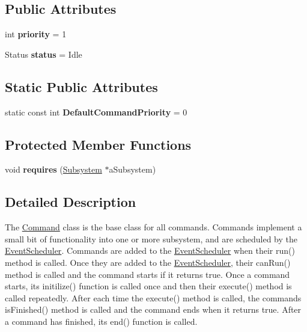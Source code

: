 \subsection*{Public Attributes}
\begin{DoxyCompactItemize}
\item 
\mbox{\label{classlib_iterative_robot_1_1_command_af2fd312376da33f5eba582db90389511}} 
int {\bfseries priority} = 1
\item 
\mbox{\label{classlib_iterative_robot_1_1_command_a54548a957a6b4097837c41fcc660467e}} 
Status {\bfseries status} = Idle
\end{DoxyCompactItemize}
\subsection*{Static Public Attributes}
\begin{DoxyCompactItemize}
\item 
\mbox{\label{classlib_iterative_robot_1_1_command_a37cc89119a9f76d0dda57ea21c877c7c}} 
static const int {\bfseries Default\+Command\+Priority} = 0
\end{DoxyCompactItemize}
\subsection*{Protected Member Functions}
\begin{DoxyCompactItemize}
\item 
\mbox{\label{classlib_iterative_robot_1_1_command_ad7b7f328974f5f17a2a4b1593b6c9eb5}} 
void {\bfseries requires} (\mbox{\hyperlink{classlib_iterative_robot_1_1_subsystem}{Subsystem}} $\ast$a\+Subsystem)
\end{DoxyCompactItemize}


\subsection{Detailed Description}
The \mbox{\hyperlink{classlib_iterative_robot_1_1_command}{Command}} class is the base class for all commands. Commands implement a small bit of functionality into one or more subsystem, and are scheduled by the \mbox{\hyperlink{classlib_iterative_robot_1_1_event_scheduler}{Event\+Scheduler}}. Commands are added to the \mbox{\hyperlink{classlib_iterative_robot_1_1_event_scheduler}{Event\+Scheduler}} when their run() method is called. Once they are added to the \mbox{\hyperlink{classlib_iterative_robot_1_1_event_scheduler}{Event\+Scheduler}}, their can\+Run() method is called and the command starts if it returns true. Once a command starts, its initilize() function is called once and then their execute() method is called repeatedly. After each time the execute() method is called, the command\textquotesingle{}s is\+Finished() method is called and the command ends when it returns true. After a command has finished, its end() function is called. 

